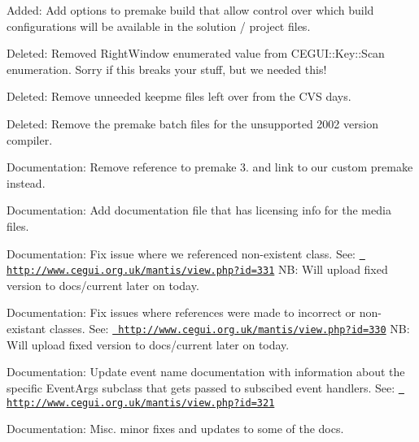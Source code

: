 \begin{DoxyItemize}
\item Added\+: Add options to premake build that allow control over which build configurations will be available in the solution / project files.
\item Deleted\+: Removed Right\+Window enumerated value from C\+E\+G\+U\+I\+::\+Key\+::\+Scan enumeration. Sorry if this breaks your stuff, but we needed this!
\item Deleted\+: Remove unneeded \textquotesingle{}keepme\textquotesingle{} files left over from the C\+VS days.
\item Deleted\+: Remove the premake batch files for the unsupported 2002 version compiler.
\item Documentation\+: Remove reference to premake 3. and link to our custom premake instead.
\item Documentation\+: Add documentation file that has licensing info for the media files.
\item Documentation\+: Fix issue where we referenced non-\/existent class. See\+: \href{http://www.cegui.org.uk/mantis/view.php?id=331}{\texttt{ http\+://www.\+cegui.\+org.\+uk/mantis/view.\+php?id=331}} NB\+: Will upload fixed version to docs/current later on today.
\item Documentation\+: Fix issues where references were made to incorrect or non-\/existant classes. See\+: \href{http://www.cegui.org.uk/mantis/view.php?id=330}{\texttt{ http\+://www.\+cegui.\+org.\+uk/mantis/view.\+php?id=330}} NB\+: Will upload fixed version to docs/current later on today.
\item Documentation\+: Update event name documentation with information about the specific Event\+Args subclass that gets passed to subscibed event handlers. See\+: \href{http://www.cegui.org.uk/mantis/view.php?id=321}{\texttt{ http\+://www.\+cegui.\+org.\+uk/mantis/view.\+php?id=321}}
\item Documentation\+: Misc. minor fixes and updates to some of the docs.
\end{DoxyItemize}

